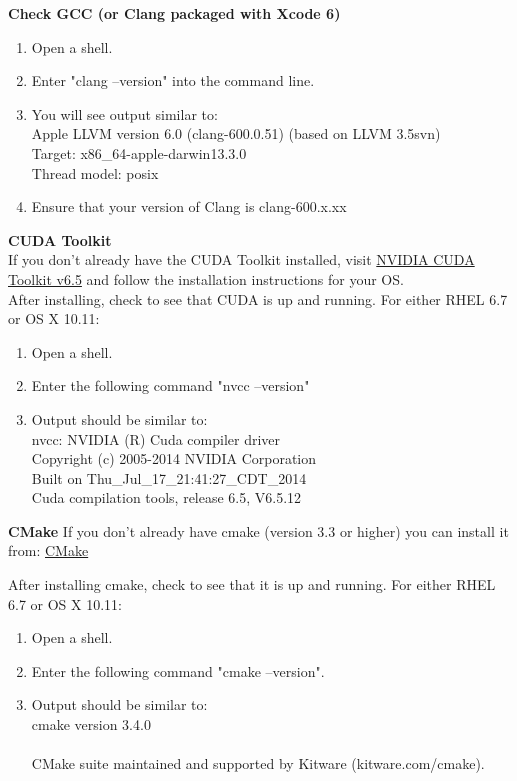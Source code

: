 \documentclass[12pt]{article}
\begin{document}
\textbf{Check GCC (or Clang packaged with Xcode 6)}
\begin{enumerate}
\item Open a shell.
\item Enter "clang --version" into the command line.
\item You will see output similar to: \\
Apple LLVM version 6.0 (clang-600.0.51) (based on LLVM 3.5svn) \\
Target: x86\_64-apple-darwin13.3.0 \\
Thread model: posix
\item Ensure that your version of Clang is clang-600.x.xx
\end{enumerate}
\textbf{CUDA Toolkit}\\

If you don't already have the CUDA Toolkit installed, visit \href{https://developer.nvidia.com/cuda-toolkit-65}{NVIDIA CUDA Toolkit v6.5} and follow the installation instructions for your OS.\\

After installing, check to see that CUDA is up and running. For either RHEL 6.7 or OS X 10.11:
\begin{enumerate}
\item Open a shell.
\item Enter the following command "nvcc --version"
\item Output should be similar to:\\
nvcc: NVIDIA (R) Cuda compiler driver\\
Copyright (c) 2005-2014 NVIDIA Corporation\\
Built on Thu\_Jul\_17\_21:41:27\_CDT\_2014\\
Cuda compilation tools, release 6.5, V6.5.12\\
\end{enumerate}

\textbf{CMake}
If you don't already have cmake (version 3.3 or higher) you can install it from: \href{https://cmake.org/download/}{CMake}

After installing cmake, check to see that it is up and running. For either RHEL 6.7 or OS X 10.11:
\begin{enumerate}
\item Open a shell.
\item Enter the following command "cmake --version".
\item Output should be similar to:\\
cmake version 3.4.0\\
\\
CMake suite maintained and supported by Kitware (kitware.com/cmake).
\end{enumerate}
\end{document}
